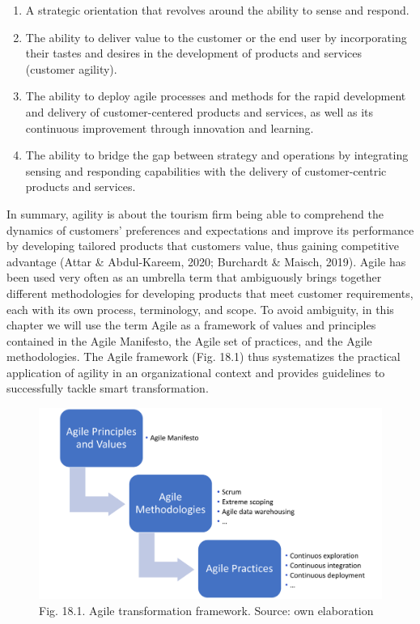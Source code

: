 \documentclass[
  letterpaper,
  DIV=11,
  numbers=noendperiod]{scrreprt}
\begin{document}
\begin{enumerate}
\def\labelenumi{\arabic{enumi}.}
\item
  A strategic orientation that revolves around the ability to sense and
  respond.
\item
  The ability to deliver value to the customer or the end user by
  incorporating their tastes and desires in the development of products
  and services (customer agility).
\item
  The ability to deploy agile processes and methods for the rapid
  development and delivery of customer-centered products and services,
  as well as its continuous improvement through innovation and learning.
\item
  The ability to bridge the gap between strategy and operations by
  integrating sensing and responding capabilities with the delivery of
  customer-centric products and services.
\end{enumerate}

In summary, agility is about the tourism firm being able to comprehend
the dynamics of customers' preferences and expectations and improve its
performance by developing tailored products that customers value, thus
gaining competitive advantage (Attar \& Abdul-Kareem, 2020; Burchardt \&
Maisch, 2019). Agile has been used very often as an umbrella term that
ambiguously brings together different methodologies for developing
products that meet customer requirements, each with its own process,
terminology, and scope. To avoid ambiguity, in this chapter we will use
the term Agile as a framework of values and principles contained in the
Agile Manifesto, the Agile set of practices, and the Agile
methodologies. The Agile framework (Fig. 18.1) thus systematizes the
practical application of agility in an organizational context and
provides guidelines to successfully tackle smart transformation.

\begin{figure}

{\centering \includegraphics[width=7.29167in,height=\textheight]{img/fig28.png}

}

\caption{Fig. 18.1. Agile transformation framework. Source: own
elaboration}

\end{figure}
\end{document}
